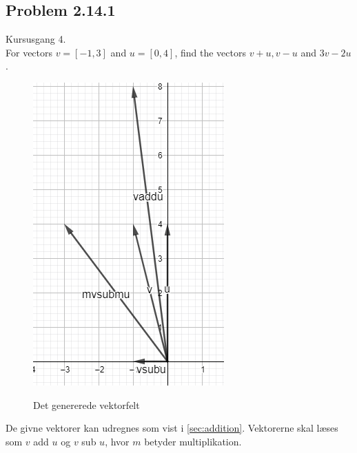 \subsection{Problem 2.14.1}
Kursusgang 4.\\
For vectors $v=[-1,3]$ and $u=[0,4]$, find the vectors $v+u, v-u$ and $3v-2u$.
\begin{figure}[h]
    \centering
    \includegraphics[]{img/vecfield2141}
    \label{ex:2141}
    \caption{Det genererede vektorfelt}
\end{figure}
De givne vektorer kan udregnes som vist i \cref{sec:addition}.
Vektorerne skal læses som $v$ add $u$ og $v$ sub $u$, hvor $m$ betyder multiplikation.